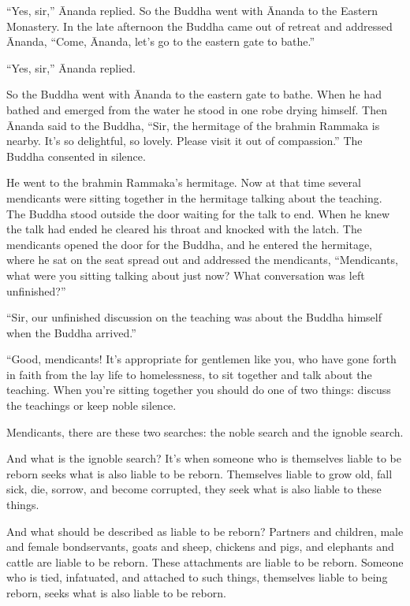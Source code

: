 \documentclass[12pt,openany]{book}%
\begin{document}
“Yes, sir,” Ānanda replied. So the Buddha went with Ānanda to the Eastern Monastery. In the late afternoon the Buddha came out of retreat and addressed Ānanda, “Come, Ānanda, let’s go to the eastern gate to bathe.” 

“Yes, sir,” Ānanda replied. 

So the Buddha went with Ānanda to the eastern gate to bathe. When he had bathed and emerged from the water he stood in one robe drying himself. Then Ānanda said to the Buddha, “Sir, the hermitage of the brahmin Rammaka is nearby. It’s so delightful, so lovely. Please visit it out of compassion.” The Buddha consented in silence. 

He went to the brahmin Rammaka’s hermitage. Now at that time several mendicants were sitting together in the hermitage talking about the teaching. The Buddha stood outside the door waiting for the talk to end. When he knew the talk had ended he cleared his throat and knocked with the latch. The mendicants opened the door for the Buddha, and he entered the hermitage, where he sat on the seat spread out and addressed the mendicants, “Mendicants, what were you sitting talking about just now? What conversation was left unfinished?” 

“Sir, our unfinished discussion on the teaching was about the Buddha himself when the Buddha arrived.” 

“Good, mendicants! It’s appropriate for gentlemen like you, who have gone forth in faith from the lay life to homelessness, to sit together and talk about the teaching. When you’re sitting together you should do one of two things: discuss the teachings or keep noble silence. 

Mendicants, there are these two searches: the noble search and the ignoble search. 

And what is the ignoble search? It’s when someone who is themselves liable to be reborn seeks what is also liable to be reborn. Themselves liable to grow old, fall sick, die, sorrow, and become corrupted, they seek what is also liable to these things. 

And what should be described as liable to be reborn? Partners and children, male and female bondservants, goats and sheep, chickens and pigs, and elephants and cattle are liable to be reborn. These attachments are liable to be reborn. Someone who is tied, infatuated, and attached to such things, themselves liable to being reborn, seeks what is also liable to be reborn. 
\end{document}
